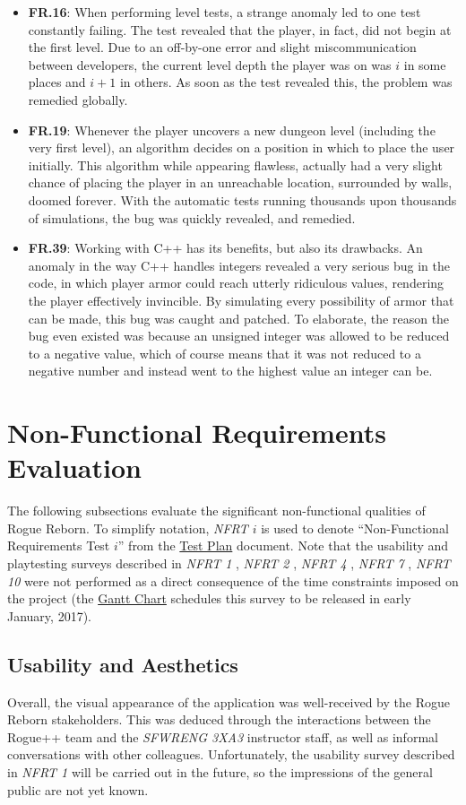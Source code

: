 \documentclass[12pt, titlepage]{article}
\newcommand{\newsection}[1]{
  \newpage
  \section{#1}
}
\newcommand{\nfrt}[1]{
	\textit{NFRT #1}
}
\begin{document}
	\begin{itemize}
		\item[] \textbf{FR.16}: When performing level tests, a strange anomaly led to one test constantly failing. The test revealed that the player, in fact, did not begin at the first level. Due to an off-by-one error and slight miscommunication between developers, the current level depth the player was on was $i$ in some places and $i+1$ in others. As soon as the test revealed this, the problem was remedied globally.
		\item[] \textbf{FR.19}: Whenever the player uncovers a new dungeon level (including the very first level), an algorithm decides on a position in which to place the user initially. This algorithm while appearing flawless, actually had a very slight chance of placing the player in an unreachable location, surrounded by walls, doomed forever. With the automatic tests running thousands upon thousands of simulations, the bug was quickly revealed, and remedied.
		\item[] \textbf{FR.39}: Working with C++ has its benefits, but also its drawbacks. An anomaly in the way C++ handles integers revealed a very serious bug in the code, in which player armor could reach utterly ridiculous values, rendering the player effectively invincible. By simulating every possibility of armor that can be made, this bug was caught and patched. To elaborate, the reason the bug even existed was because an unsigned integer was allowed to be reduced to a negative value, which of course means that it was not reduced to a negative number and instead went to the highest value an integer can be.
	\end{itemize}


\newsection{Non-Functional Requirements Evaluation} \label{Section_NFR_Evaluation}
	The following subsections evaluate the significant non-functional qualities of Rogue Reborn.  To simplify notation, \textit{NFRT $i$} is used to denote ``Non-Functional Requirements Test $i$'' from the \href{run:../TestPlan/TestPlan.pdf}{Test Plan} document.  Note that the usability and playtesting surveys described in \nfrt{1}, \nfrt{2}, \nfrt{4}, \nfrt{7}, \nfrt{10} were not performed as a direct consequence of the time constraints imposed on the project (the \href{run:../../ProjectSchedule/rogue.gan}{Gantt Chart} schedules this survey to be released in early January, 2017).

	\subsection{Usability and Aesthetics}
		Overall, the visual appearance of the application was well-received by the Rogue Reborn stakeholders.  This was deduced through the interactions between the Rogue++ team and the \textit{SFWRENG 3XA3} instructor staff, as well as informal conversations with other colleagues.  Unfortunately, the usability survey described in \nfrt{1} will be carried out in the future, so the impressions of the general public are not yet known.\\
\end{document}

